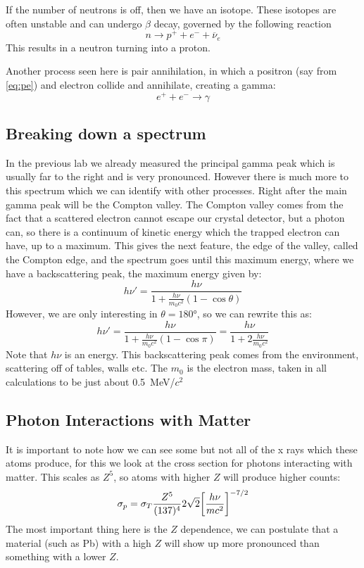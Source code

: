 \documentclass[letterpaper,12pt]{article}
\begin{document}
If the number of neutrons is off, then we have an isotope. These isotopes are often unstable and can undergo $\beta$ decay, governed by the following reaction
\begin{equation}
  \label{eq:beta}
  n\to p^++e^-+\overline{\nu}_e
\end{equation}
This results in a neutron turning into a proton.

Another process seen here is pair annihilation, in which a positron (say from \eqref{eq:pe}) and electron collide and annihilate, creating a gamma:
\begin{equation}
  \label{eq:ann}
  e^++e^-\to\gamma
\end{equation}
\subsection{Breaking down a spectrum}
In the previous lab we already measured the principal gamma peak which is usually far to the right and is very pronounced. However there is much more to this spectrum which we can identify with other processes. Right after the main gamma peak will be the Compton valley. The Compton valley comes from the fact that a scattered electron cannot escape our crystal detector, but a photon can, so there is a continuum of kinetic energy which the trapped electron can have, up to a maximum. This gives the next feature, the edge of the valley, called the Compton edge, and the spectrum goes until this maximum energy, where we have a backscattering peak, the maximum energy given by:
\begin{equation*}
  h\nu'=\frac{h\nu}{1+\frac{h\nu}{m_0c^2}(1-\cos\theta)}
\end{equation*}
However, we are only interesting in $\theta=\ang{180}$, so we can rewrite this as:
\begin{equation}
  \label{eq:back}
  h\nu'=\frac{h\nu}{1+\frac{h\nu}{m_0c^2}(1-\cos\pi)}=
  \boxed{\frac{h\nu}{1+2\frac{h\nu}{m_0c^2}}}
\end{equation}
Note that $h\nu$ is an energy. This backscattering peak comes from the environment, scattering off of tables, walls etc. The $m_0$ is the electron mass, taken in all calculations to be just about \SI{0.5}{\mega\eV}/$c^2$

\subsection{Photon Interactions with Matter}
It is important to note how we can see some but not all of the x rays which these atoms produce, for this we look at the cross section for photons interacting with matter. This scales as $Z^5$, so atoms with higher $Z$ will produce higher counts:
\begin{equation}
  \label{eq:cross}
  \sigma_p=\sigma_T\frac{Z^5}{(137)^4}2\sqrt{2}\qty[\frac{h\nu}{mc^2}]^{-7/2}
\end{equation}
The most important thing here is the $Z$ dependence, we can postulate that a material (such as Pb) with a high $Z$ will show up more pronounced than something with a lower $Z$.
\end{document}
